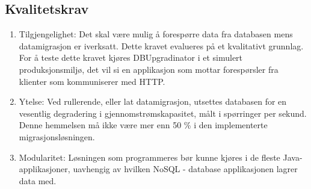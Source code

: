 \subsection{Kvalitetskrav}

\begin{enumerate}
  \item Tilgjengelighet: Det skal være mulig å forespørre data fra databasen mens datamigrasjon er iverksatt. Dette kravet evalueres på et kvalitativt grunnlag. For å teste dette kravet kjøres DBUpgradinator i et simulert produksjonsmiljø, det vil si en applikasjon som mottar forespørsler fra klienter som kommuniserer med HTTP.
  \item Ytelse: Ved rullerende, eller lat datamigrasjon, utsettes databasen for en vesentlig degradering i gjennomstrømskapasitet, målt i spørringer per sekund. Denne hemmelsen må ikke være mer enn 50 \% i den implementerte migrasjonsløsningen.
  \item Modularitet: Løsningen som programmeres bør kunne kjøres i de fleste Java-applikasjoner, uavhengig av hvilken NoSQL - database applikasjonen lagrer data med.
\end{enumerate}


